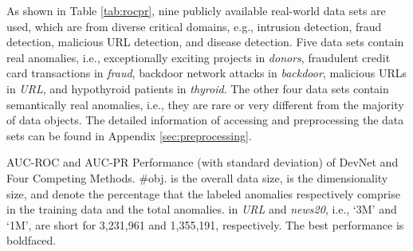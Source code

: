 \documentclass[sigconf]{acmart}
\begin{document}
As shown in Table \ref{tab:rocpr}, nine publicly available real-world data sets are used, which are from diverse critical domains, e.g., intrusion detection, fraud detection, malicious URL detection, and disease detection. Five data sets contain real anomalies, i.e., exceptionally exciting projects in \textit{donors}, fraudulent credit card transactions in \textit{fraud}, backdoor network attacks in \textit{backdoor}, malicious URLs in \textit{URL}, and hypothyroid patients in \textit{thyroid}. The other four data sets contain semantically real anomalies, i.e., they are rare or very different from the majority of data objects. The detailed information of accessing and preprocessing the data sets can be found in Appendix \ref{sec:preprocessing}.


\begin{table*}[htbp]
  \centering
  \caption{AUC-ROC and AUC-PR Performance (with  standard deviation) of DevNet and Four Competing Methods. \#obj. is the overall data size,  is the dimensionality size,  and  denote the percentage that the labeled anomalies respectively comprise in the training data and the total anomalies.  in \textit{URL} and \textit{news20}, i.e., `3M' and `1M', are short for 3,231,961 and 1,355,191, respectively. The best performance is boldfaced. }



\end{table*}
\end{document}
